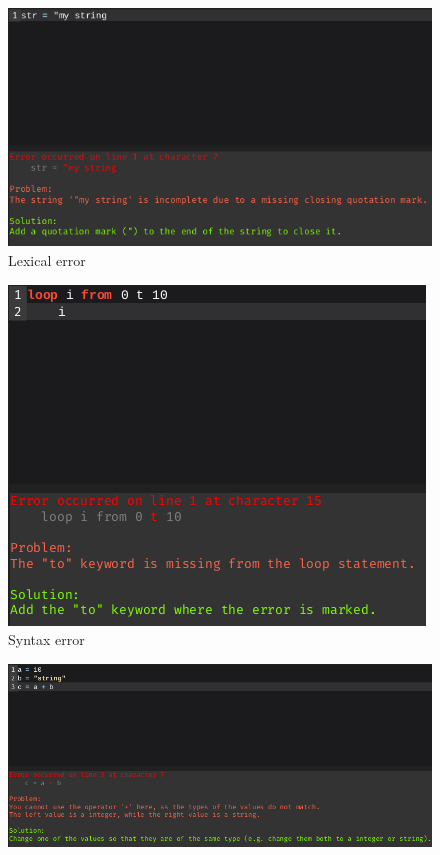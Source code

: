 \documentclass[
]{report}
\begin{document}
\begin{appendices}
	\begin{figure}
		\centering
		\includegraphics[width=\textwidth]{lexical-error}
		\caption{Lexical error}
		\label{fig:lexical-error}
	\end{figure}
	\begin{figure}
		\centering
		\includegraphics[width=\textwidth]{syntax-error}
		\caption{Syntax error}
		\label{fig:syntax-error}
	\end{figure}
	\begin{figure}
		\centering
		\includegraphics[width=\textwidth]{semantic-error}

\end{figure}
\end{appendices}
\end{document}
